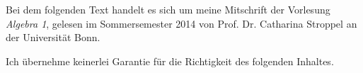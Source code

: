 Bei dem folgenden Text handelt es sich um meine Mitschrift der Vorlesung \emph{Algebra 1}, gelesen im Sommersemester 2014 von Prof. Dr. Catharina Stroppel an der Universität Bonn.

Ich übernehme keinerlei Garantie für die Richtigkeit des folgenden Inhaltes.